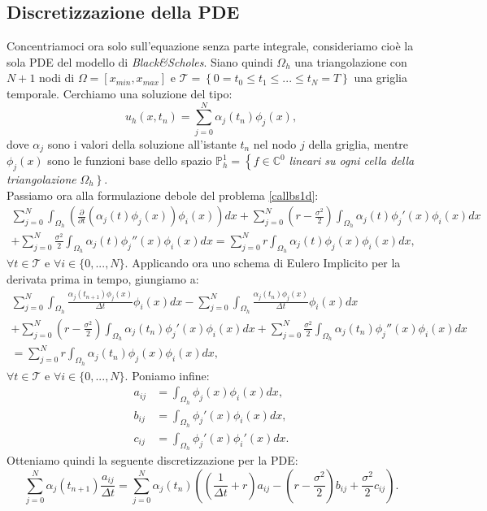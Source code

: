 \documentclass[a4paper,10pt]{report}
\theoremstyle{plain}
\theoremstyle{definition}
\theoremstyle{remark}
\begin{document}
\subsection{Discretizzazione della PDE}
Concentriamoci ora solo sull'equazione senza parte integrale, consideriamo cio\`e la sola PDE del modello di \emph{Black\&Scholes}. Siano quindi $\Omega_h$ una triangolazione con $N+1$ nodi di $\Omega=[x_{min},x_{max}]$ e $\mathcal{T}=\left\{0= t_0\leq t_1\leq ... \leq t_N=T\right\}$ una griglia temporale. Cerchiamo una soluzione del tipo: $$u_h(x,t_n)=\sum_{j=0}^{N}\alpha_j(t_n)\phi_j(x),$$ dove $\alpha_j$ sono i valori della soluzione all'istante $t_n$ nel nodo $j$ della griglia, mentre $\phi_j(x)$ sono le funzioni base dello spazio $\mathbb{P}_h^1=\left\{f\in\mathbb{C}^0\right.$ \emph{lineari su ogni cella della triangolazione} $\Omega_h\left.\right\}$.\\Passiamo ora alla formulazione debole del problema \ref{callbs1d}:
\begin{multline}
\sum_{j=0}^{N}\int_{\Omega_h}\left(\frac{\partial}{\partial t}(\alpha_j(t)\phi_j(x))\phi_i(x)\right)dx+\sum_{j=0}^{N}\left(r-\frac{\sigma^2}{2}\right)\int_{\Omega_h}\alpha_j(t)\phi_j'(x)\phi_i(x)dx\\
+\sum_{j=0}^{N}\frac{\sigma^2}{2}\int_{\Omega_h}\alpha_j(t)\phi_j''(x)\phi_i(x)dx=\sum_{j=0}^{N}r\int_{\Omega_h}\alpha_j(t)\phi_j(x)\phi_i(x)dx,
\end{multline}
$\forall t\in\mathcal{T}$ e $\forall i\in\{0,...,N\}$. Applicando ora uno schema di Eulero Implicito per la derivata prima in tempo, giungiamo a:
\begin{multline}
\sum_{j=0}^{N}\int_{\Omega_h}\frac{\alpha_j(t_{n+1})\phi_j(x)}{\Delta t}\phi_i(x)dx-\sum_{j=0}^{N}\int_{\Omega_h}\frac{\alpha_j(t_n)\phi_j(x)}{\Delta t}\phi_i(x)dx\\
+\sum_{j=0}^{N}\left(r-\frac{\sigma^2}{2}\right)\int_{\Omega_h}\alpha_j(t_n)\phi_j'(x)\phi_i(x)dx+\sum_{j=0}^{N}\frac{\sigma^2}{2}\int_{\Omega_h}\alpha_j(t_n)\phi_j''(x)\phi_i(x)dx\\
=\sum_{j=0}^{N}r\int_{\Omega_h}\alpha_j(t_n)\phi_j(x)\phi_i(x)dx,
\end{multline}
$\forall t\in\mathcal{T}$ e $\forall i\in\{0,...,N\}$. Poniamo infine:
\begin{align*}
a_{ij}&=\int_{\Omega_h}\phi_j(x)\phi_i(x)dx,\\
b_{ij}&=\int_{\Omega_h}\phi_j'(x)\phi_i(x)dx,\\
c_{ij}&=\int_{\Omega_h}\phi_j'(x)\phi_i'(x)dx.
\end{align*}
Otteniamo quindi la seguente discretizzazione per la PDE:$$\sum_{j=0}^{N}\alpha_j(t_{n+1})\frac{a_{ij}}{\Delta t}=\sum_{j=0}^{N}\alpha_j(t_{n})\left(\left(\frac{1}{\Delta t}+r\right)a_{ij}-\left(r-\frac{\sigma^2}{2}\right)b_{ij}+\frac{\sigma^2}{2}c_{ij}\right).$$
\end{document}
